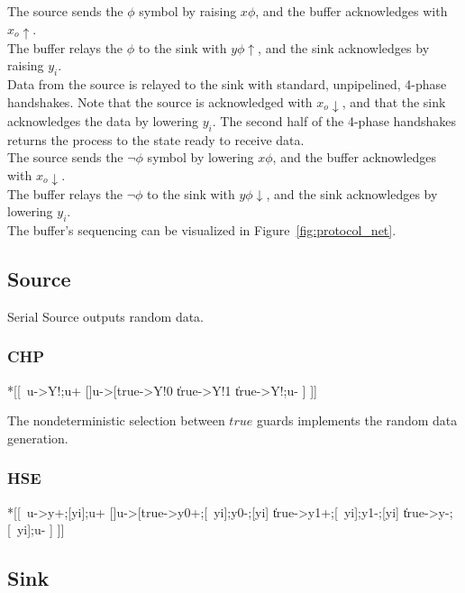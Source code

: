 \documentclass{article}
\begin{document}
\noindent
The source sends the $\phi$ symbol by raising $x\phi$, and the buffer
acknowledges with $x_o\uparrow$. \\
The buffer relays the $\phi$ to the sink with $y\phi\uparrow$, and the
sink acknowledges by raising $y_i$. \\
Data from the source is relayed to the sink with standard, unpipelined,
4-phase handshakes. Note that the source is acknowledged with $x_o\downarrow$, 
and that the sink acknowledges the data by lowering $y_i$. 
The second half of the 4-phase handshakes returns the process to the state 
ready to receive data. \\
The source sends the $\neg\phi$ symbol by lowering $x\phi$, and the buffer
acknowledges with $x_o\downarrow$. \\
The buffer relays the $\neg\phi$ to the sink with $y\phi\downarrow$, and the
sink acknowledges by lowering $y_i$. \\

\noindent
The buffer's sequencing can be visualized in Figure~\ref{fig:protocol_net}.

\subsection{Source}

Serial Source outputs random data.

\subsubsection*{CHP}

\begin{csp}
*[[~u->Y!\phi;u+
  []u->[true->Y!0
         \|true->Y!1
         \|true->Y!\neg\phi;u-
         ]
 ]]
\end{csp}

\noindent
The nondeterministic selection between $true$ guards implements the random
data generation.

\subsubsection*{HSE}

\begin{hse}
*[[~u->y\phi+;[yi];u+
  []u->[true->y0+;[~yi];y0-;[yi]
         \|true->y1+;[~yi];y1-;[yi]
         \|true->y\phi-;[~yi];u-
         ]
 ]]
\end{hse}

\subsection{Sink}
\end{document}

